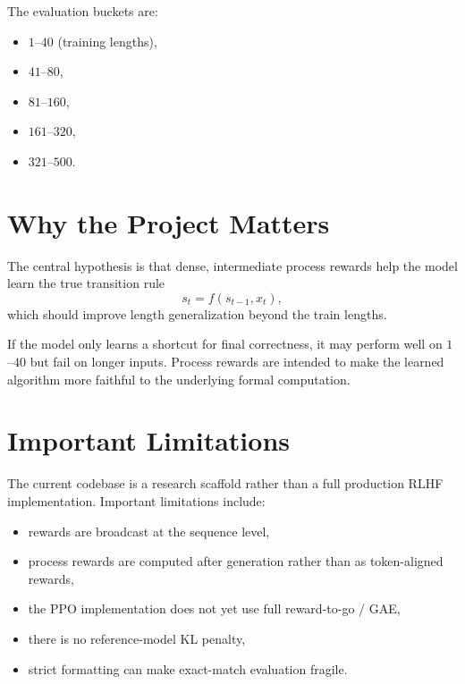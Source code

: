 \documentclass[11pt]{article}
\begin{document}
The evaluation buckets are:
\begin{itemize}[leftmargin=*]
  \item $1$--$40$ (training lengths),
  \item $41$--$80$,
  \item $81$--$160$,
  \item $161$--$320$,
  \item $321$--$500$.
\end{itemize}

\section{Why the Project Matters}
The central hypothesis is that dense, intermediate process rewards help the model learn the true transition rule
\[
 s_t = f(s_{t-1},x_t),
\]
which should improve length generalization beyond the train lengths.

If the model only learns a shortcut for final correctness, it may perform well on $1$--$40$ but fail on longer inputs. Process rewards are intended to make the learned algorithm more faithful to the underlying formal computation.

\section{Important Limitations}
The current codebase is a research scaffold rather than a full production RLHF implementation. Important limitations include:
\begin{itemize}[leftmargin=*]
  \item rewards are broadcast at the sequence level,
  \item process rewards are computed after generation rather than as token-aligned rewards,
  \item the PPO implementation does not yet use full reward-to-go / GAE,
  \item there is no reference-model KL penalty,
  \item strict formatting can make exact-match evaluation fragile.
\end{itemize}
\end{document}

